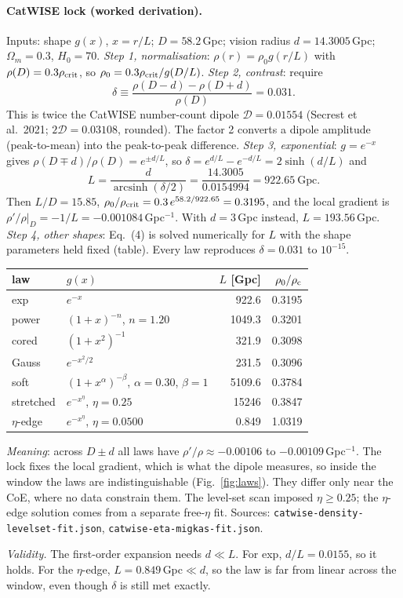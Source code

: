 \documentclass[10pt,twocolumn]{article}
\newcommand{\why}[1]{\par\noindent\textit{Validity.} #1\par}
\begin{document}
\paragraph{CatWISE lock (worked derivation).} Inputs: shape $g(x)$, $x=r/L$; $D=58.2$\,Gpc; vision radius $d=14.3005$\,Gpc; $\Omega_m=0.3$, $H_0=70$. \emph{Step 1, normalisation}: $\rho(r)=\rho_0g(r/L)$ with $\rho(D)=0.3\rho_{\rm crit}$, so $\rho_0=0.3\rho_{\rm crit}/g(D/L)$. \emph{Step 2, contrast}: require
\begin{equation}
\delta\equiv\frac{\rho(D-d)-\rho(D+d)}{\rho(D)}=0.031 .
\end{equation}
This is twice the CatWISE number-count dipole $\mathcal D=0.01554$ (Secrest et al.\ 2021; $2\mathcal D=0.03108$, rounded). The factor 2 converts a dipole amplitude (peak-to-mean) into the peak-to-peak difference. \emph{Step 3, exponential}: $g=e^{-x}$ gives $\rho(D\mp d)/\rho(D)=e^{\pm d/L}$, so $\delta=e^{d/L}-e^{-d/L}=2\sinh(d/L)$ and
\begin{equation}
L=\frac{d}{\operatorname{arcsinh}(\delta/2)}=\frac{14.3005}{0.0154994}=922.65\ \text{Gpc}.
\end{equation}
Then $L/D=15.85$, $\rho_0/\rho_{\rm crit}=0.3\,e^{58.2/922.65}=0.3195$, and the local gradient is $\rho'/\rho|_D=-1/L=-0.001084$\,Gpc$^{-1}$. With $d=3$\,Gpc instead, $L=193.56$\,Gpc. \emph{Step 4, other shapes}: Eq.~(4) is solved numerically for $L$ with the shape parameters held fixed (table). Every law reproduces $\delta=0.031$ to $10^{-15}$.
\begin{center}\small\begin{tabular}{@{}llrr@{}}
law & $g(x)$ & $L$ [Gpc] & $\rho_0/\rho_{\rm c}$\\\hline
exp & $e^{-x}$ & 922.6 & 0.3195\\
power & $(1+x)^{-n}$, $n{=}1.20$ & 1049.3 & 0.3201\\
cored & $(1+x^2)^{-1}$ & 321.9 & 0.3098\\
Gauss & $e^{-x^2/2}$ & 231.5 & 0.3096\\
soft & $(1+x^{\alpha})^{-\beta}$, $\alpha{=}0.30$, $\beta{=}1$ & 5109.6 & 0.3784\\
stretched & $e^{-x^{\eta}}$, $\eta{=}0.25$ & 15246 & 0.3847\\
$\eta$-edge & $e^{-x^{\eta}}$, $\eta{=}0.0500$ & 0.849 & 1.0319\\
\end{tabular}\end{center}
\emph{Meaning}: across $D\pm d$ all laws have $\rho'/\rho\approx-0.00106$ to $-0.00109$\,Gpc$^{-1}$. The lock fixes the local gradient, which is what the dipole measures, so inside the window the laws are indistinguishable (Fig.~\ref{fig:laws}). They differ only near the CoE, where no data constrain them. The level-set scan imposed $\eta\ge0.25$; the $\eta$-edge solution comes from a separate free-$\eta$ fit. Sources: \texttt{catwise-density-levelset-fit.json}, \texttt{catwise-eta-migkas-fit.json}.
\why{The first-order expansion needs $d\ll L$. For exp, $d/L=0.0155$, so it holds. For the $\eta$-edge, $L=0.849$\,Gpc$\ll d$, so the law is far from linear across the window, even though $\delta$ is still met exactly.}
\end{document}
